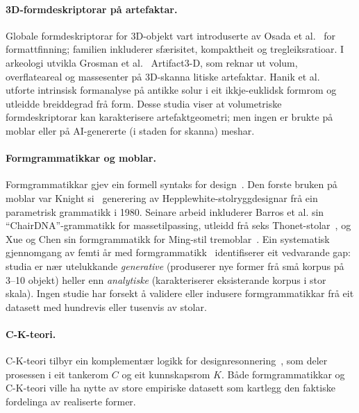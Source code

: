 \paragraph{3D-formdeskriptorar p\aa{} artefaktar.}
Globale formdeskriptorar for 3D-objekt vart introduserte av Osada et al.~\cite{osada2002shape}
for formattfinning; familien inkluderer sf\ae risitet, kompaktheit og tregleiksratioar.
I arkeologi utvikla Grosman et al.~\cite{grosman2022artifact3d} Artifact3-D,
som reknar ut volum, overflateareal og massesenter p\aa{} 3D-skanna litiske artefaktar.
Hanik et al.~\cite{hanik2023sundials} utforte intrinsisk formanalyse
p\aa{} antikke solur i eit ikkje-euklidsk formrom og utleidde breiddegrad fr\aa{} form.
Desse studia viser at volumetriske formdeskriptorar kan karakterisere artefaktgeometri;
men ingen er brukte p\aa{} moblar eller p\aa{} AI-genererte (i staden for skanna) meshar.

\paragraph{Formgrammatikkar og moblar.}
Formgrammatikkar gjev ein formell syntaks for design~\cite{stiny1972shape,stiny1980introduction,stiny2006shape,stiny1991algebras}.
Den forste bruken p\aa{} moblar var Knight si~\cite{knight1980hepplewhite} generering
av Hepplewhite-stolryggdesignar fr\aa{} ein parametrisk grammatikk i 1980.
Seinare arbeid inkluderer Barros et al. sin ``ChairDNA''-grammatikk
for massetilpassing, utleidd fr\aa{} seks Thonet-stolar~\cite{barros2016chair},
og Xue og Chen sin formgrammatikk for Ming-stil tremoblar~\cite{xuechen2024shape}.
Ein systematisk gjennomgang av femti \aa r med formgrammatikk~\cite{haakonsen2023shapegrammar}
identifiserer eit vedvarande gap: studia er n\ae r utelukkande \emph{generative}
(produserer nye former fr\aa{} sm\aa{} korpus p\aa{} 3--10 objekt)
heller enn \emph{analytiske} (karakteriserer eksisterande korpus i stor skala).
Ingen studie har forsekt \aa{} validere eller indusere formgrammatikkar
fr\aa{} eit datasett med hundrevis eller tusenvis av stolar.

\paragraph{C-K-teori.}
C-K-teori tilbyr ein komplement\ae r logikk for designresonnering~\cite{hatchuel2003new,hatchuel2009ck},
som deler prosessen i eit tankerom $C$ og eit kunnskapsrom $K$.
B\aa de formgrammatikkar og C-K-teori ville ha nytte av store empiriske datasett
som kartlegg den faktiske fordelinga av realiserte former.

